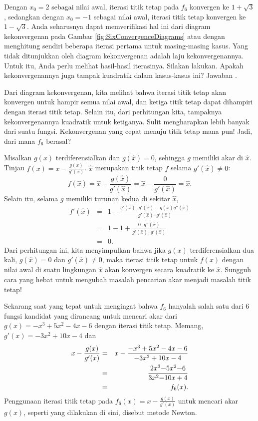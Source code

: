 Dengan $x_{0}=2$ sebagai nilai awal, iterasi titik tetap pada $f_{6}$
konvergen ke $1+\sqrt{3}$, sedangkan dengan $x_{0}=-1$ sebagai nilai
awal, iterasi titik tetap konvergen ke $1-\sqrt{3}$. Anda seharusnya
dapat memverifikasi hal ini dari diagram kekonvergenan pada Gambar
\ref{fig:SixConvergenceDiagrams} atau dengan menghitung sendiri beberapa
iterasi pertama untuk masing-masing kasus. Yang tidak ditunjukkan
oleh diagram kekonvergenan adalah laju kekonvergenannya. Untuk itu,
Anda perlu melihat hasil-hasil iterasinya. Silakan lakukan. Apakah
kekonvergenannya juga tampak kuadratik dalam kasus-kasus ini? Jawaban
.

Dari diagram kekonvergenan, kita melihat bahwa iterasi titik tetap
akan konvergen untuk hampir semua nilai awal, dan ketiga titik tetap
dapat dihampiri dengan iterasi titik tetap. Selain itu, dari perhitungan
kita, tampaknya kekonvergenannya kuadratik untuk ketiganya. Sulit
mengharapkan lebih banyak dari suatu fungsi. Kekonvergenan yang cepat
menuju titik tetap mana pun! Jadi, dari mana $f_{6}$ berasal?

Misalkan $g(x)$ terdiferensialkan dan $g(\hat{x})=0$, sehingga $g$
memiliki akar di $\hat{x}$. Tinjau $f(x)=x-\frac{g(x)}{g'(x)}$.
$\hat{x}$ merupakan titik tetap $f$ selama $g'(\hat{x})\neq0$:
\[
f(\hat{x})=\hat{x}-\frac{g(\hat{x})}{g'(\hat{x})}=\hat{x}-\frac{0}{g'(\hat{x})}=\hat{x}.
\]
Selain itu, selama $g$ memiliki turunan kedua di sekitar $\hat{x}$,
\begin{eqnarray*}
f'(\hat{x}) & = & 1-\frac{g'(\hat{x})\cdot g'(\hat{x})-g(\hat{x})g''(\hat{x})}{g'(\hat{x})\cdot g'(\hat{x})}\\
 & = & 1-1+\frac{0\cdot g''(\hat{x})}{g'(\hat{x})\cdot g'(\hat{x})}\\
 & = & 0.
\end{eqnarray*}
Dari perhitungan ini, kita menyimpulkan bahwa jika $g(x)$ terdiferensialkan
dua kali, $g(\hat{x})=0$ dan $g'(\hat{x})\neq0$, maka iterasi titik
tetap untuk $f(x)$ dengan nilai awal di suatu lingkungan $\hat{x}$
akan konvergen secara kuadratik ke $\hat{x}$. Sungguh cara yang hebat
untuk mengubah masalah pencarian akar menjadi masalah titik tetap!

Sekarang saat yang tepat untuk mengingat bahwa $f_{6}$ hanyalah salah
satu dari 6 fungsi kandidat yang dirancang untuk mencari akar dari
$g(x)=-x^{3}+5x^{2}-4x-6$ dengan iterasi titik tetap. Memang, $g'(x)=-3x^{2}+10x-4$
dan 
\begin{eqnarray*}
x-\frac{g(x)}{g'(x)} & = & x-\frac{-x^{3}+5x^{2}-4x-6}{-3x^{2}+10x-4}\\
 & = & \frac{2x^{3}\text{\textminus}5x^{2}\text{\textminus}6}{3x^{2}\text{\textminus}10x+4}\\
 & = & f_{6}(x).
\end{eqnarray*}
Penggunaan iterasi titik tetap pada $f_{6}(x)=x-\frac{g(x)}{g'(x)}$
untuk mencari akar $g(x)$, seperti yang dilakukan di sini, disebut
 metode Newton.

